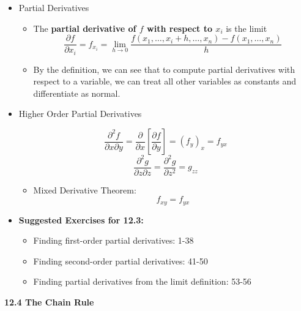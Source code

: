 \documentclass[12pt]{article}
\newcommand{\<}{\left<}
\renewcommand{\>}{\right>}
\begin{document}
  \begin{itemize}
  
    \item Partial Derivatives 
    
      \begin{itemize}
        \item The \textbf{partial derivative of $f$ with respect to $x_i$} is the limit \[\frac{\partial f}{\partial x_i}=f_{x_i}=\lim_{h\to 0}\frac{f(x_1,\dots,x_i+h,\dots,x_n)-f(x_1,\dots,x_n)}{h}\]
        \item By the definition, we can see that to compute partial derivatives with respect to a variable, we can treat all other variables as constants and differentiate as normal.
      \end{itemize}
      
    \item Higher Order Partial Derivatives

      \[
        \frac{\partial^2 f}{\partial x\partial y} = \frac{\partial}{\partial x}\left[ \frac{\partial f}{\partial y} \right] = (f_y)_x = f_{yx}
      \] 
      \[
        \frac{\partial^2 g}{\partial z\partial z}= \frac{\partial^2 g}{\partial z^2}= g_{zz}
      \]
    
      \begin{itemize}
        \item Mixed Derivative Theorem:
          \[f_{xy}=f_{yx}\]
      \end{itemize}
    
    \item \textbf{Suggested Exercises for 12.3:}
    
      \begin{itemize}
        \item Finding first-order partial derivatives: 1-38
        \item Finding second-order partial derivatives: 41-50
        \item Finding partial derivatives from the limit definition: 53-56
      \end{itemize}
  
  \end{itemize}
  
  \newpage
  
  \centerline{\bf 12.4 The Chain Rule}
  
\end{document}
